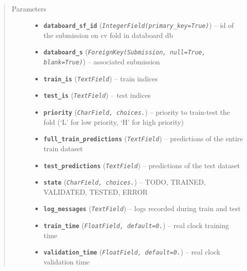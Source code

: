 \documentclass[letterpaper,10pt,english]{sphinxmanual}
\begin{document}
\begin{fulllineitems}
\label{modules/models:runapp.models.SubmissionFold}~\begin{quote}\begin{description}
\item[{Parameters}] \leavevmode\begin{itemize}
\item {} 
\textbf{\texttt{databoard\_sf\_id}} (\emph{\texttt{IntegerField(primary\_key=True)}}) -- id of the submission on cv fold in databoard db

\item {} 
\textbf{\texttt{databoard\_s}} (\emph{\texttt{ForeignKey(Submission, null=True, blank=True)}}) -- associated submission

\item {} 
\textbf{\texttt{train\_is}} (\emph{\texttt{TextField}}) -- train indices

\item {} 
\textbf{\texttt{test\_is}} (\emph{\texttt{TextField}}) -- test indices

\item {} 
\textbf{\texttt{priority}} (\emph{\texttt{CharField, choices.}}) -- priority to train-test the fold        (`L' for low priority, `H' for high priority)

\item {} 
\textbf{\texttt{full\_train\_predictions}} (\emph{\texttt{TextField}}) -- predictions of the entire train dataset

\item {} 
\textbf{\texttt{test\_predictions}} (\emph{\texttt{TextField}}) -- predictions of the test dataset

\item {} 
\textbf{\texttt{state}} (\emph{\texttt{CharField, choices.}}) -- TODO, TRAINED, VALIDATED, TESTED, ERROR

\item {} 
\textbf{\texttt{log\_messages}} (\emph{\texttt{TextField}}) -- logs recorded during train and test

\item {} 
\textbf{\texttt{train\_time}} (\emph{\texttt{FloatField, default=0.}}) -- real clock training time

\item {} 
\textbf{\texttt{validation\_time}} (\emph{\texttt{FloatField, default=0.}}) -- real clock validation time


\end{itemize}
\end{description}
\end{quote}
\end{fulllineitems}
\end{document}
